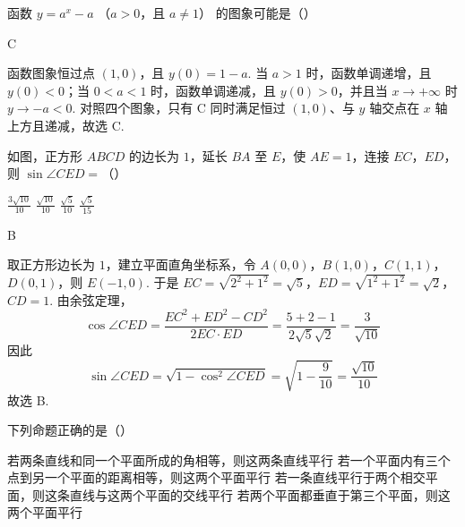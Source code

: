 \begin{problem}
函数 \( y = a^x - a \) （\( a > 0 \)，且 \( a \neq 1 \)） 的图象可能是（\quad）

    {}
    {}
    {}
\end{problem}

\begin{answer}
C
\end{answer}

\begin{solution}
函数图象恒过点 \((1,0)\)，且 \(y(0)=1-a\). 当 \(a>1\) 时，函数单调递增，且 \(y(0)<0\)；当 \(0<a<1\) 时，函数单调递减，且 \(y(0)>0\)，并且当 \(x\to+\infty\) 时 \(y\to-a<0\). 对照四个图象，只有 C 同时满足恒过 \((1,0)\)、与 \(y\) 轴交点在 \(x\) 轴上方且递减，故选 C.
\end{solution}

\begin{problem}
如图，正方形 \(ABCD\) 的边长为 \(1\)，延长 \(BA\) 至 \(E\)，使 \(AE = 1\)，连接 \(EC\)，\(ED\)，则 \(\sin \angle CED =\)（\quad）


\choices
    {\(\frac{3\sqrt{10}}{10}\)}
    {\(\frac{\sqrt{10}}{10}\)}
    {\(\frac{\sqrt{5}}{10}\)}
    {\(\frac{\sqrt{5}}{15}\)}
\end{problem}

\begin{answer}
B
\end{answer}

\begin{solution}
取正方形边长为 \(1\)，建立平面直角坐标系，令 \(A(0,0)\)，\(B(1,0)\)，\(C(1,1)\)，\(D(0,1)\)，则 \(E(-1,0)\). 于是
\(EC=\sqrt{2^2+1^2}=\sqrt5\)，\(ED=\sqrt{1^2+1^2}=\sqrt2\)，\(CD=1\).
由余弦定理，
\[
\cos\angle CED=\frac{EC^2+ED^2-CD^2}{2EC\cdot ED}
=\frac{5+2-1}{2\sqrt5\sqrt2}=\frac3{\sqrt{10}}
\]
因此
\[
\sin\angle CED=\sqrt{1-\cos^2\angle CED}
=\sqrt{1-\frac9{10}}=\frac{\sqrt{10}}{10}
\]
故选 B.
\end{solution}

\begin{problem}
下列命题正确的是（\quad）

\choices
    {若两条直线和同一个平面所成的角相等，则这两条直线平行}
    {若一个平面内有三个点到另一个平面的距离相等，则这两个平面平行}
    {若一条直线平行于两个相交平面，则这条直线与这两个平面的交线平行}
    {若两个平面都垂直于第三个平面，则这两个平面平行}
\end{problem}


